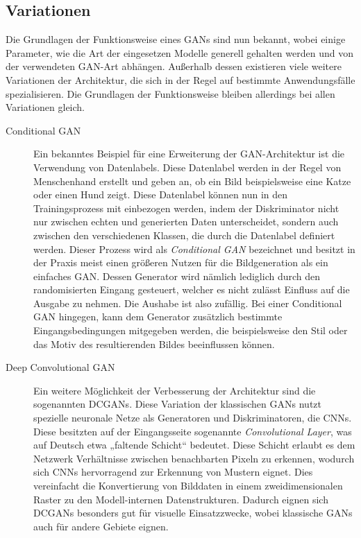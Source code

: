 \subsection{Variationen}

\noindent Die Grundlagen der Funktionsweise eines \acp{GAN} sind nun bekannt, wobei einige Parameter, wie die Art der eingesetzen Modelle generell gehalten werden und von der verwendeten GAN-Art abhängen. Außerhalb dessen existieren viele weitere Variationen der Architektur, die sich in der Regel auf bestimmte Anwendungsfälle spezialisieren. Die Grundlagen der Funktionsweise bleiben allerdings bei allen Variationen gleich. \\

\begin{description}
    \item[Conditional GAN] Ein bekanntes Beispiel für eine Erweiterung der \ac{GAN}-Architektur ist die Verwendung von Datenlabels. Diese Datenlabel werden in der Regel von Menschenhand erstellt und geben an, ob ein Bild beispielsweise eine Katze oder einen Hund zeigt. Diese Datenlabel können nun in den Trainingsprozess mit einbezogen werden, indem der Diskriminator nicht nur zwischen echten und generierten Daten unterscheidet, sondern auch zwischen den verschiedenen Klassen, die durch die Datenlabel definiert werden. Dieser Prozess wird als \textit{Conditional GAN} bezeichnet und besitzt in der Praxis meist einen größeren Nutzen für die Bildgeneration als ein einfaches \ac{GAN}. Dessen Generator wird nämlich lediglich durch den randomisierten Eingang gesteuert, welcher es nicht zulässt Einfluss auf die Ausgabe zu nehmen. Die Aushabe ist also zufällig. Bei einer Conditional GAN hingegen, kann dem Generator zusätzlich bestimmte Eingangsbedingungen mitgegeben werden, die beispielsweise den Stil oder das Motiv des resultierenden Bildes beeinflussen können.

    \newpage

    \item[Deep Convolutional GAN] Ein weitere Möglichkeit der Verbesserung der Architektur sind die sogenannten \acp{DCGAN}. Diese Variation der klassischen \acp{GAN} nutzt spezielle neuronale Netze als Generatoren und Diskriminatoren, die \acp{CNN}. Diese besitzten auf der Eingangsseite sogenannte \textit{Convolutional Layer}, was auf Deutsch etwa „faltende Schicht“ bedeutet. Diese Schicht erlaubt es dem Netzwerk Verhältnisse zwischen benachbarten Pixeln zu erkennen, wodurch sich \acp{CNN} hervorragend zur Erkennung von Mustern eignet. Dies vereinfacht die Konvertierung von Bilddaten in einem zweidimensionalen Raster zu den Modell-internen Datenstrukturen. Dadurch eignen sich \acp{DCGAN} besonders gut für visuelle Einsatzzwecke, wobei klassische \acp{GAN} auch für andere Gebiete eignen. 


\end{description}
